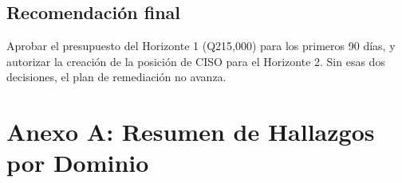 \documentclass[11pt,a4paper]{article}
\begin{document}
	\subsection{Recomendación final}
	
	Aprobar el presupuesto del Horizonte 1 (Q215,000) para los primeros 90 días, y autorizar la creación de la posición de CISO para el Horizonte 2. Sin esas dos decisiones, el plan de remediación no avanza.
	
	
	\newpage
	\appendix
	
	\section{Anexo A: Resumen de Hallazgos por Dominio}
	
\end{document}
